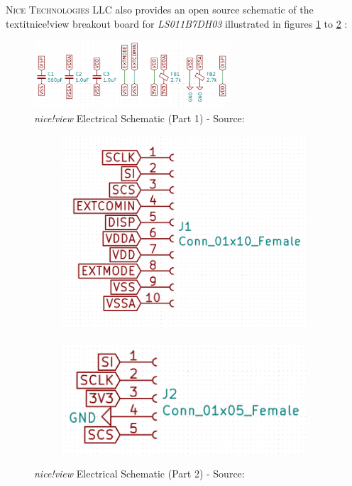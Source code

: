 \documentclass[report.tex]{subfiles}
\begin{document}
\textsc{Nice Technologies LLC} also provides an open source schematic of the textit{nice!view} breakout board for \textit{LS011B7DH03} illustrated in figures \ref{fig:niceview_schematic_1} to \ref{fig:niceview_schem} :

\begin{figure}[H]
	\centering
	\includegraphics[width=0.65\textwidth]{Include/Figure/comp/niceview_schematic_1.png}
	\caption{\textit{nice!view} Electrical Schematic (Part 1) - Source: \cite{niceview}}
	\label{fig:niceview_schematic_1}
\end{figure}

\begin{figure}[H]
	\centering
\begin{subfigure}{.3\textwidth}
	\centering
	\includegraphics[width=1\textwidth]{Include/Figure/comp/niceview_schematic_2.png}
	\end{subfigure}
\begin{subfigure}{.3\textwidth}
	\centering
	\includegraphics[width=1\textwidth]{Include/Figure/comp/niceview_schematic_3.png}
	\end{subfigure}
	\caption{\textit{nice!view} Electrical Schematic (Part 2) - Source: \cite{niceview}}
	\label{fig:niceview_schem}
\end{figure}
\end{document}
